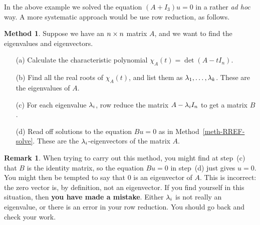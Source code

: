 \documentclass[reqno]{amsart}
\theoremstyle{definition}
\newtheorem{remark}[theorem]{Remark}
\newtheorem{method}[theorem]{Method}
\begin{document}
In the above example we solved the equation $(A+I_3)u=0$ in a rather
\emph{ad hoc} way.  A more systematic approach would be use row
reduction, as follows.
\begin{method}\label{meth-eigen}
 Suppose we have an $n\times n$ matrix $A$, and we want to find the
 eigenvalues and eigenvectors.
 \begin{itemize}
  \item[(a)] Calculate the characteristic polynomial
   $\chi_A(t)=\det(A-t I_n)$.
  \item[(b)] Find all the real roots of $\chi_A(t)$, and list them as
   $\lambda_1,\dotsc,\lambda_k$.  These are the eigenvalues of $A$.
  \item[(c)] For each eigenvalue $\lambda_i$, row reduce the matrix
   $A-\lambda_i I_n$ to get a matrix $B$.
  \item[(d)] Read off solutions to the equation $Bu=0$ as in
   Method~\ref{meth-RREF-solve}.  These are the $\lambda_i$-eigenvectors
   of the matrix $A$.
 \end{itemize}
\end{method}

\begin{remark}\label{eg-eigenvalue-error}
 When trying to carry out this method, you might find at step~(c) that
 $B$ is the identity matrix, so the equation $Bu=0$ in step~(d) just
 gives $u=0$.  You might then be tempted to say that $0$ is an
 eigenvector of $A$.  This is incorrect: the zero vector is, by
 definition, not an eigenvector.  If you find yourself in this
 situation, then \textbf{you have made a mistake}.  Either $\lambda_i$ is
 not really an eigenvalue, or there is an error in your row
 reduction.  You should go back and check your work.
\end{remark}
\end{document}

